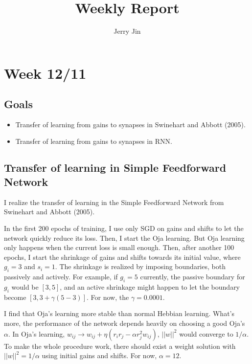\documentclass[12pt, a4paper]{article}
\title{Weekly Report}
\author{Jerry Jin}
\begin{document}
\maketitle

\section*{Week 12/11}

\subsection*{Goals}

\begin{itemize}
    \item Transfer of learning from gains to synapses in Swinehart and Abbott (2005).

    \item Transfer of learning from gains to synapses in RNN.

\end{itemize}

\newpage

\subsection*{Transfer of learning in Simple Feedforward Network}

I realize the transfer of learning in the Simple Feedforward Network from Swinehart and Abbott (2005).

In the first 200 epochs of training, I use only SGD on gains and shifts to let the network quickly reduce its loss. Then, I start the Oja learning. But Oja learning only happens when the current loss is small enough.  Then, after another 100 epochs, I start the shrinkage of gains and shifts towards its initial value, where $g_i=3$ and $s_i=1$. The shrinkage is realized by imposing boundaries, both passively and actively. For example, if $g_i=5$ currently, the passive boundary for $g_i$ would be $[3,5]$, and an active shrinkage might happen to let the boundary become $[3,3+\gamma(5-3)]$. For now, the $\gamma=0.0001$.

I find that Oja's learning more stable than normal Hebbian learning. What's more, the performance of the network depends heavily on choosing a good Oja's $\alpha$. In Oja's learning, $w_{ij} \rightarrow w_{ij} + \eta (r_i r_j - \alpha r_j^2 w_{ij})$, $||w||^2$ would converge to $1/\alpha$. To make the whole procedure work, there should exist a weight solution with $||w||^2=1/\alpha$ using initial gains and shifts. For now, $\alpha=12$.
\end{document}
